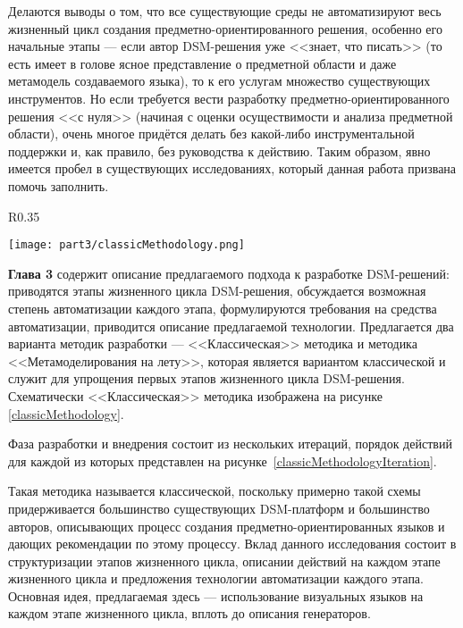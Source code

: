 Делаются выводы о том, что все существующие среды не автоматизируют весь жизненный цикл
создания предметно-ориентированного решения, особенно его начальные этапы --- если автор DSM-решения уже 
<<знает, что писать>> (то есть имеет в голове ясное представление о предметной области 
и даже метамодель создаваемого языка), то к его услугам множество существующих инструментов. 
Но если требуется вести разработку предметно-ориентированного решения <<с нуля>> (начиная 
с оценки осуществимости и анализа предметной области), очень многое придётся делать 
без какой-либо инструментальной поддержки и, как правило, без руководства к действию.
Таким образом, явно имеется пробел в существующих исследованиях, который данная работа
призвана помочь заполнить.

\begin{wrapfigure}{R}{0.35\textwidth}
	\begin{center}
		\texttt{[image: part3/classicMethodology.png]}
		\caption{<<Классическая>> методика разработки.}
		\label{classicMethodology}
	\end{center}
\end{wrapfigure}

\textbf{Глава 3} содержит описание предлагаемого подхода к разработке 
DSM-решений: приводятся этапы жизненного цикла DSM-решения, обсуждается 
возможная степень автоматизации каждого этапа, формулируются требования на 
средства автоматизации, приводится описание предлагаемой технологии. Предлагается
два варианта методик разработки --- <<Классическая>> методика и методика <<Метамоделирования
на лету>>, которая является вариантом классической и служит для упрощения первых этапов
жизненного цикла DSM-решения. Схематически <<Классическая>> методика изображена на рисунке
\ref{classicMethodology}.

Фаза разработки и внедрения состоит из нескольких итераций, порядок действий для каждой 
из которых представлен на рисунке~\ref{classicMethodologyIteration}. 

Такая методика называется классической, поскольку примерно такой схемы придерживается
большинство существующих DSM-платформ и большинство авторов, описывающих процесс создания
предметно-ориентированных языков и дающих рекомендации по этому процессу. Вклад данного 
исследования состоит в структуризации этапов жизненного цикла, описании действий на 
каждом этапе жизненного цикла и предложения технологии автоматизации каждого этапа.
Основная идея, предлагаемая здесь --- использование визуальных языков на каждом
этапе жизненного цикла, вплоть до описания генераторов.

